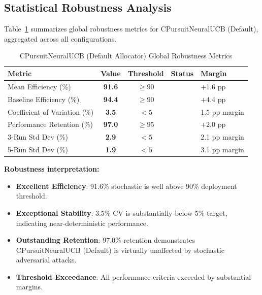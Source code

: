 \documentclass[12pt,a4paper]{article}
\newcommand{\success}[1]{\textcolor{accentgreen}{\textbf{#1}}}
\begin{document}
\subsection{Statistical Robustness Analysis}

Table~\ref{tab:robustness} summarizes global robustness metrics for CPursuitNeuralUCB (Default), aggregated across all configurations.

\begin{table}[H]
\centering
\caption{CPursuitNeuralUCB (Default Allocator) Global Robustness Metrics}
\label{tab:robustness}
\begin{tabular}{@{}lcccl@{}}
\toprule
\textbf{Metric} & \textbf{Value} & \textbf{Threshold} & \textbf{Status} & \textbf{Margin} \\
\midrule
Mean Efficiency (\%) & \success{91.6} & $\geq 90$ & \success{\checkmark} & +1.6 pp \\
Baseline Efficiency (\%) & \success{94.4} & $\geq 90$ & \success{\checkmark} & +4.4 pp \\
Coefficient of Variation (\%) & \success{3.5} & $<5$ & \success{\checkmark} & 1.5 pp margin \\
Performance Retention (\%) & \success{97.0} & $\geq 95$ & \success{\checkmark} & +2.0 pp \\
3-Run Std Dev (\%) & \success{2.9} & $<5$ & \success{\checkmark} & 2.1 pp margin \\
5-Run Std Dev (\%) & \success{1.9} & $<5$ & \success{\checkmark} & 3.1 pp margin \\
\bottomrule
\end{tabular}
\end{table}

\textbf{Robustness interpretation:}

\begin{itemize}
    \item \success{Excellent Efficiency}: 91.6\% stochastic is well above 90\% deployment threshold.
    \item \success{Exceptional Stability}: 3.5\% CV is substantially below 5\% target, indicating near-deterministic performance.
    \item \success{Outstanding Retention}: 97.0\% retention demonstrates CPursuitNeuralUCB (Default) is virtually unaffected by stochastic adversarial attacks.
    \item \success{Threshold Exceedance}: All performance criteria exceeded by substantial margins.
\end{itemize}
\end{document}
